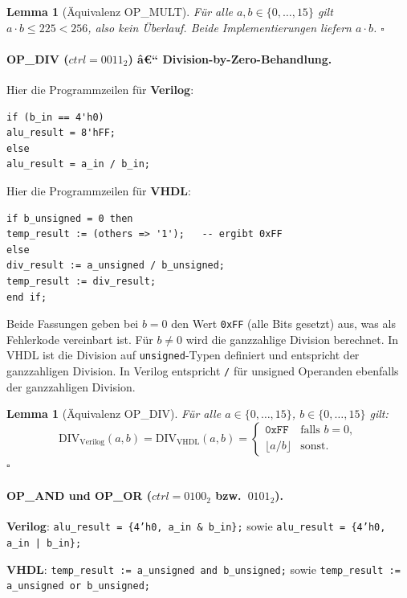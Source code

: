 ﻿\documentclass[12pt,a4paper]{report}
\newtheorem{lemma}[theorem]{Lemma}
\begin{document}
\begin{lemma}[Äquivalenz OP\_MULT]
	Für alle $a, b \in \{0,\ldots,15\}$ gilt $a \cdot b \leq 225 < 256$, also
	kein Überlauf.  Beide Implementierungen liefern $a \cdot b$. \hfill $\square$
\end{lemma}

\paragraph{OP\_DIV ($ctrl = 0011_2$) â€“ Division-by-Zero-Behandlung.}
Hier die Programmzeilen für \textbf{Verilog}:
\begin{lstlisting}[style=hdlstyle]
if (b_in == 4'h0)
alu_result = 8'hFF;
else
alu_result = a_in / b_in;
\end{lstlisting}
Hier die Programmzeilen für \textbf{VHDL}:
\begin{lstlisting}[style=hdlstyle]
if b_unsigned = 0 then
temp_result := (others => '1');   -- ergibt 0xFF
else
div_result := a_unsigned / b_unsigned;
temp_result := div_result;
end if;
\end{lstlisting}

Beide Fassungen geben bei $b = 0$ den Wert \texttt{0xFF} (alle Bits gesetzt)
aus, was als Fehlerkode vereinbart ist.  Für $b \neq 0$ wird die ganzzahlige
Division berechnet.  In VHDL ist die Division auf \texttt{unsigned}-Typen
definiert und entspricht der ganzzahligen Division.  In Verilog entspricht
\texttt{/} für unsigned Operanden ebenfalls der ganzzahligen Division.

\begin{lemma}[Äquivalenz OP\_DIV]
	\label{lem:div_equiv}
	Für alle $a \in \{0,\ldots,15\}$, $b \in \{0,\ldots,15\}$ gilt:
	\[
	\mathrm{DIV}_\mathrm{Verilog}(a,b) = \mathrm{DIV}_\mathrm{VHDL}(a,b)
	= \begin{cases} \mathtt{0xFF} & \text{falls } b = 0, \\ \lfloor a/b \rfloor & \text{sonst.} \end{cases}
	\]
	\hfill $\square$
\end{lemma}

\paragraph{OP\_AND und OP\_OR ($ctrl = 0100_2$ bzw.\ $0101_2$).}

\textbf{Verilog}: \texttt{alu\_result = \{4'h0, a\_in \& b\_in\};}
sowie \texttt{alu\_result = \{4'h0, a\_in | b\_in\};}

\textbf{VHDL}: \texttt{temp\_result := a\_unsigned and b\_unsigned;}
sowie \texttt{temp\_result := a\_un\newline signed or b\_unsigned;}
\end{document}
